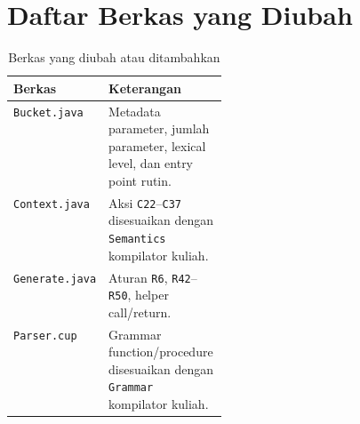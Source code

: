 \documentclass[11pt,a4paper]{article}
\begin{document}
\appendix
\section{Daftar Berkas yang Diubah}

\begin{table}[ht]
\centering
\caption{Berkas yang diubah atau ditambahkan}
\label{tab:files}
\begin{tabularx}{\linewidth}{@{}p{0.28\linewidth}X@{}}
\toprule
\textbf{Berkas} & \textbf{Keterangan} \\
\midrule
\texttt{Bucket.java}   & Metadata parameter, jumlah parameter, lexical level, dan entry point rutin. \\
\texttt{Context.java}  & Aksi \texttt{C22}--\texttt{C37} disesuaikan dengan \texttt{Semantics} kompilator kuliah. \\
\texttt{Generate.java} & Aturan \texttt{R6}, \texttt{R42}--\texttt{R50}, helper call/return. \\
\texttt{Parser.cup}    & Grammar function/procedure disesuaikan dengan \texttt{Grammar} kompilator kuliah. \\
\bottomrule
\end{tabularx}
\end{table}
\end{document}

